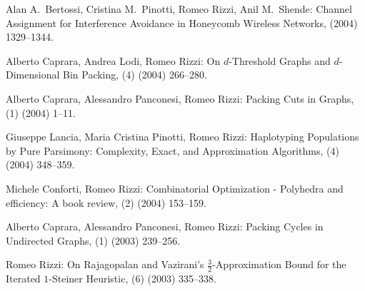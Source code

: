 \begin{etaremune}
  \item {\sc Alan A.~Bertossi, Cristina M.~Pinotti, Romeo Rizzi, Anil M.~Shende:}
   \newblock  Channel Assignment for Interference Avoidance in Honeycomb Wireless Networks,
    (2004) 1329--1344.

  \item {\sc Alberto Caprara, Andrea Lodi, Romeo Rizzi:}
   \newblock  On $d$-Threshold Graphs and $d$-Dimensional Bin Packing,
   (4) (2004) 266--280.

  \item {\sc Alberto Caprara, Alessandro Panconesi, Romeo Rizzi:}
   \newblock  Packing Cuts in Graphs,
   (1) (2004) 1--11.

  \item {\sc Giuseppe Lancia, Maria Cristina Pinotti, Romeo Rizzi:}
   \newblock  Haplotyping Populations by Pure Parsimony: Complexity, 
              Exact, and Approximation Algorithms,
   (4) (2004) 348--359.

  \item {\sc Michele Conforti, Romeo Rizzi:}  
   \newblock  Combinatorial Optimization
              - Polyhedra and efficiency: A book review,
   (2) (2004) 153--159.

  \item {\sc Alberto Caprara, Alessandro Panconesi, Romeo Rizzi:}
   \newblock  Packing Cycles in Undirected Graphs,
   (1) (2003) 239--256.

  \item {\sc Romeo Rizzi:}
   \newblock  On Rajagopalan and Vazirani's $\frac{3}{2}$-Approximation
              Bound for the Iterated $1$-Steiner Heuristic,
   (6) (2003) 335--338.


\end{etaremune}
